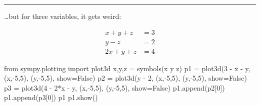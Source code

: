 \documentclass[
  letterpaper,
  DIV=11,
  numbers=noendperiod]{scrartcl}
\newenvironment{Shaded}{\begin{snugshade}}{\end{snugshade}}
\newcommand{\DecValTok}[1]{\textcolor[rgb]{0.68,0.00,0.00}{#1}}
\newcommand{\ImportTok}[1]{\textcolor[rgb]{0.00,0.46,0.62}{#1}}
\newcommand{\NormalTok}[1]{\textcolor[rgb]{0.00,0.23,0.31}{#1}}
\newcommand{\OperatorTok}[1]{\textcolor[rgb]{0.37,0.37,0.37}{#1}}
\newcommand{\StringTok}[1]{\textcolor[rgb]{0.13,0.47,0.30}{#1}}
\newcommand{\VariableTok}[1]{\textcolor[rgb]{0.07,0.07,0.07}{#1}}
\begin{document}
\begin{center}\rule{0.5\linewidth}{0.5pt}\end{center}

\ldots but for three variables, it gets weird:

\[\begin{align*}
x + y + z &= 3 \\   
y - z &= 2 \\ 
2x + y + z &= 4 
\end{align*}\]

\begin{Shaded}
\begin{Highlighting}[]
\ImportTok{from}\NormalTok{ sympy.plotting }\ImportTok{import}\NormalTok{ plot3d}
\NormalTok{x,y,z }\OperatorTok{=}\NormalTok{ symbols(}\StringTok{\textquotesingle{}x y z\textquotesingle{}}\NormalTok{)}
\NormalTok{p1 }\OperatorTok{=}\NormalTok{ plot3d(}\DecValTok{3} \OperatorTok{{-}}\NormalTok{ x }\OperatorTok{{-}}\NormalTok{ y, (x,}\OperatorTok{{-}}\DecValTok{5}\NormalTok{,}\DecValTok{5}\NormalTok{), (y,}\OperatorTok{{-}}\DecValTok{5}\NormalTok{,}\DecValTok{5}\NormalTok{), show}\OperatorTok{=}\VariableTok{False}\NormalTok{)}
\NormalTok{p2 }\OperatorTok{=}\NormalTok{ plot3d(y }\OperatorTok{{-}} \DecValTok{2}\NormalTok{, (x,}\OperatorTok{{-}}\DecValTok{5}\NormalTok{,}\DecValTok{5}\NormalTok{), (y,}\OperatorTok{{-}}\DecValTok{5}\NormalTok{,}\DecValTok{5}\NormalTok{), show}\OperatorTok{=}\VariableTok{False}\NormalTok{)}
\NormalTok{p3 }\OperatorTok{=}\NormalTok{ plot3d(}\DecValTok{4} \OperatorTok{{-}} \DecValTok{2}\OperatorTok{*}\NormalTok{x }\OperatorTok{{-}}\NormalTok{ y, (x,}\OperatorTok{{-}}\DecValTok{5}\NormalTok{,}\DecValTok{5}\NormalTok{), (y,}\OperatorTok{{-}}\DecValTok{5}\NormalTok{,}\DecValTok{5}\NormalTok{), show}\OperatorTok{=}\VariableTok{False}\NormalTok{)}
\NormalTok{p1.append(p2[}\DecValTok{0}\NormalTok{])}
\NormalTok{p1.append(p3[}\DecValTok{0}\NormalTok{])}
\NormalTok{p1}
\NormalTok{p1.show()}
\end{Highlighting}
\end{Shaded}
\end{document}
